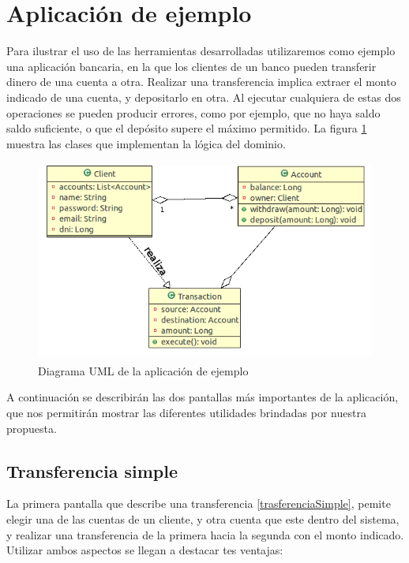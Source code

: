 \section{Aplicación de ejemplo}
Para ilustrar el uso de las herramientas desarrolladas utilizaremos como ejemplo
una aplicación bancaria, en la que los clientes de un banco pueden transferir
dinero de una cuenta a otra. 
Realizar una transferencia implica extraer el
monto indicado de una cuenta, y depositarlo en otra. 
Al ejecutar cualquiera de estas dos operaciones se pueden producir errores,
como por ejemplo, que no haya saldo saldo suficiente, o que el depósito supere
el máximo permitido.
La figura \ref{example} muestra las clases que implementan la lógica del
dominio.

	\begin{figure}[h!]
		\centering
		\includegraphics[width=450px, height=250px]{img/transaccion}
		\caption{Diagrama UML de la aplicación de ejemplo}
		\label{example}
	\end{figure}	

A continuación se describirán las dos pantallas más importantes de la
aplicación, que nos permitirán mostrar las diferentes utilidades brindadas por
nuestra propuesta.
 
\subsection{Transferencia simple}
	La primera pantalla que describe una transferencia \ref{trasferenciaSimple},
	pemite elegir una de las cuentas de un cliente, y otra cuenta que este dentro
	del sistema, y realizar una transferencia de la primera hacia la segunda con el
	monto indicado. Utilizar ambos aspectos se llegan a destacar tes ventajas:
	
